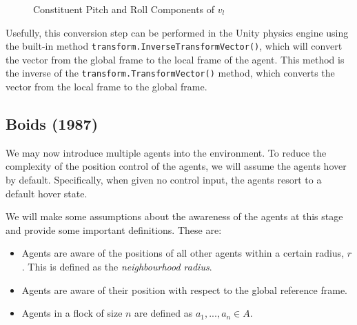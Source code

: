 \documentclass[12pt]{article}
\begin{document}
\begin{figure}[ht]
    \centering
    \caption{Constituent Pitch and Roll Components of $v_l$}
    \label{fig:pitch-roll}
\end{figure}

Usefully, this conversion step can be performed in the Unity physics engine using the built-in method \verb|transform.InverseTransformVector()|, which will convert the vector from the global frame to the local frame of the agent. This method is the inverse of the \verb|transform.TransformVector()| method, which converts the vector from the local frame to the global frame.

\subsection{Boids (1987)}
We may now introduce multiple agents into the environment. To reduce the complexity of the position control of the agents, we will assume the agents hover by default. Specifically, when given no control input, the agents resort to a default hover state.

We will make some assumptions about the awareness of the agents at this stage and provide some important definitions.
These are:
\begin{itemize}
    \item Agents are aware of the positions of all other agents within a certain radius, $r$. This is defined as the \emph{neighbourhood radius}.
    \item Agents are aware of their position with respect to the global reference frame.
    \item Agents in a flock of size $n$ are defined as $a_1,...,a_n \in A$.
\end{itemize}
\end{document}

